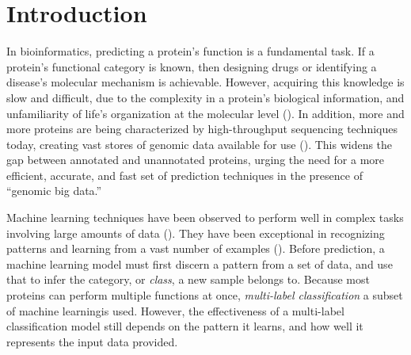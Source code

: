 %
%
%
%
%

\chapter{Introduction}
\label{Introduction}

\par In bioinformatics, predicting a protein's function is a fundamental task.
If a protein's functional category is known, then designing drugs or
identifying a disease's molecular mechanism is achievable. However, acquiring
this knowledge is slow and difficult, due to the complexity in a protein's
biological information, and unfamiliarity of life's organization at the molecular
level (\cite{baldi2001bioinformatics}). In addition, more and more proteins are
being characterized by high-throughput sequencing techniques today, creating
vast stores of genomic data available for use (\cite{gaudet2017gene, 
cozzetto2017computational}). This widens the gap between annotated and
unannotated proteins, urging the need for a more efficient, accurate, and fast
set of prediction techniques in the presence of ``genomic big data.''

\par Machine learning techniques have been observed to perform well in complex
tasks involving large amounts of data (\cite{chen2014data}). They have been
exceptional in recognizing patterns and learning from a vast number of examples 
(\cite{lecun2015deep}). Before prediction, a machine learning model must first
discern a pattern from a set of data, and use that to infer the category, or 
\textit{class}, a new sample belongs to. Because most proteins can perform
multiple functions at once, \textit{multi-label classification}\textemdash
a subset of machine learning\textemdash is used. However, the effectiveness of
a multi-label classification model still depends on the pattern it learns, and
how well it represents the input data provided.

